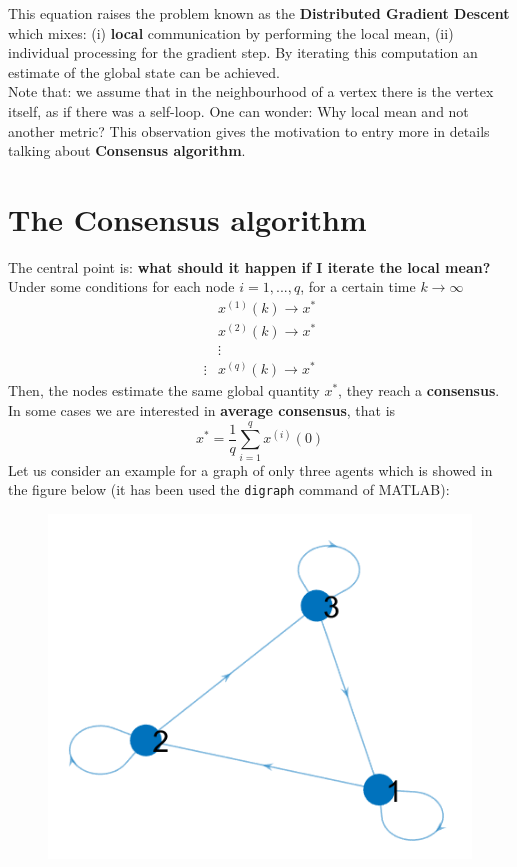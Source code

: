 This equation raises the problem known as the \textbf{Distributed Gradient Descent} which mixes: (i) \textbf{local} communication by performing the local mean, (ii) individual processing for the gradient step. By iterating this computation an estimate of the global state can be achieved. \\
{\color{blue}Note that: we assume that in the neighbourhood of a vertex there is the vertex itself, as if there was a self-loop}.
One can wonder: {\color{red} Why local mean and not another metric?} This observation gives the motivation to entry more in details talking about \textbf{Consensus algorithm}.

\section{The Consensus algorithm}
\noindent
The central point is: \textbf{what should it happen if I iterate the local mean?} Under some conditions for each node $i=1,...,q$,
for a certain time $k\rightarrow\infty$
\begin{align*}
    &x^{(1)}(k) \rightarrow x^*\\
    &x^{(2)}(k) \rightarrow x^*\\
    &\vdots\\ \vdots
    &x^{(q)}(k) \rightarrow x^*
\end{align*}
Then, the nodes estimate the same global quantity $x^*$, they reach a \textbf{consensus}. In some cases we are interested in   \textbf{average consensus}, that is
\begin{equation}
    x^*=\frac{1}{q}\sum_{i=1}^q x^{(i)}(0)
\end{equation}
Let us consider an example for a graph of only three agents which is showed in the figure below (it has been used the \texttt{digraph} command of MATLAB):
\begin{figure}[h]
    \centering
    \includegraphics[scale=0.7]{images/Es_graph.png}
\end{figure}

